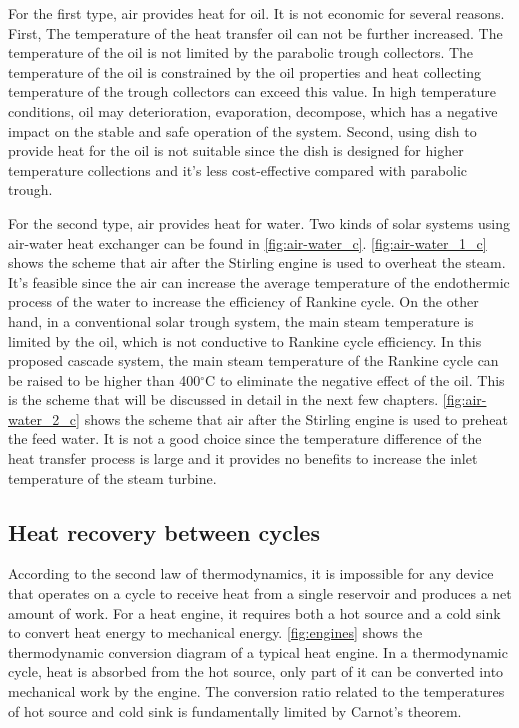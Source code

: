For the first type, air provides heat for oil. It is not economic for several reasons. First, The temperature of the heat transfer oil can not be further increased. The temperature of the oil is not limited by the parabolic trough collectors. The temperature of the oil is constrained by the oil properties and heat collecting temperature of the trough collectors can exceed this value. In high temperature conditions, oil may deterioration, evaporation, decompose, which has a negative impact on the stable and safe operation of the system. Second, using dish to provide heat for the oil is not suitable since the dish is designed for higher temperature collections and it's less cost-effective compared with parabolic trough.

For the second type, air provides heat for water. Two kinds of solar systems using air-water heat exchanger can be found in \autoref{fig:air-water_c}. \autoref{fig:air-water_1_c} shows the scheme that air after the Stirling engine is used to overheat the steam. It's feasible since the air can increase the average temperature of the endothermic process of the water to increase the efficiency of Rankine cycle. On the other hand, in a conventional solar trough system, the main steam temperature is limited by the oil, which is not conductive to Rankine cycle efficiency. In this proposed cascade system, the main steam temperature of the Rankine cycle can be raised to be higher than 400$\mathrm{^\circ C}$ to eliminate the negative effect of the oil.
This is the scheme that will be discussed in detail in the next few chapters. \autoref{fig:air-water_2_c} shows the scheme that air after the Stirling engine is used to preheat the feed water. It is not a good choice since the temperature difference of the heat transfer process is large and it provides no benefits to increase the inlet temperature of the steam turbine.

\subsection{Heat recovery between cycles}

According to the second law of thermodynamics, it is impossible for any device that operates on a cycle to receive heat from a single reservoir and produces a net amount of work. For a heat engine, it requires both a hot source and a cold sink to convert heat energy to mechanical energy. 
\autoref{fig:engines} shows the thermodynamic conversion diagram of a typical heat engine. In a thermodynamic cycle, heat is absorbed from the hot source, only part of it can be converted into mechanical work by the engine. The conversion ratio related to the temperatures of hot source and cold sink is fundamentally limited by Carnot's theorem.

